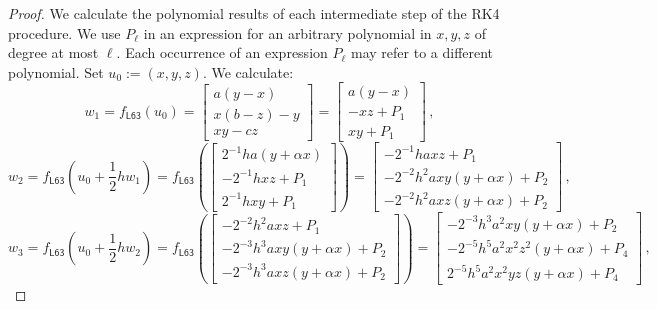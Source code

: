 \documentclass{article}
\newcommand{\lb}{\left(} %
\newcommand{\rb}{\right)} %
\newcommand{\br}[1]{\lb #1 \rb} %
\newcommand{\brOf}[1]{\!\br{#1}} %
\newcommand{\eqcm}{\,,} %
\begin{document}
\begin{proof}
	We calculate the polynomial results of each intermediate step of the RK4 procedure. We use $P_\ell$ in an expression for an arbitrary polynomial in $x,y,z$ of degree at most $\ell$. Each occurrence of an expression $P_\ell$ may refer to a different polynomial. Set $u_0 := (x,y,z)$. We calculate:
	\begin{equation*}
		w_1 = f_{\mathsf{L63}}(u_0) = \begin{bmatrix}
			a(y-x)\\
			x(b - z) - y\\
			xy - c z
		\end{bmatrix} =
		\begin{bmatrix}
			a(y-x)\\
			-xz + P_1\\
			xy + P_1
		\end{bmatrix}
		\eqcm
	\end{equation*}
	\begin{equation*}
		w_2 = f_{\mathsf{L63}}\brOf{u_0 + \frac{1}{2}h w_1}
		=
		f_{\mathsf{L63}}\brOf{\begin{bmatrix}
				2^{-1}ha(y + \alpha x) \\
				-2^{-1}hxz + P_1\\
				2^{-1}hxy + P_1
		\end{bmatrix}}
		=
		\begin{bmatrix}
			-2^{-1}haxz + P_1\\
			-2^{-2}h^2axy(y+\alpha x) + P_2\\
			-2^{-2}h^2axz(y+\alpha x) + P_2
		\end{bmatrix}
		\eqcm
	\end{equation*}
	\begin{equation*}
		w_3 = f_{\mathsf{L63}}\brOf{u_0 + \frac{1}{2}h w_2}
		=
		f_{\mathsf{L63}}\brOf{
		\begin{bmatrix}
			-2^{-2}h^2axz + P_1\\
			-2^{-3}h^3axy(y+\alpha x) + P_2\\
			-2^{-3}h^3axz(y+\alpha x) + P_2
		\end{bmatrix}
		}
		=
		\begin{bmatrix}
			-2^{-3}h^3a^2xy(y+\alpha x) + P_2\\
			-2^{-5}h^5a^2x^2z^2(y+\alpha x) + P_4\\
			2^{-5}h^5a^2x^2yz(y+\alpha x) + P_4
		\end{bmatrix}
		\eqcm
	\end{equation*}
	\begin{equation*}

\end{equation*}
\end{proof}
\end{document}
